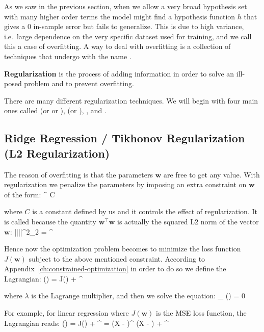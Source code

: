 As we saw in the previous section, when we allow a very broad hypothesis set with many higher order terms the model
might find a hypothesis function $h$ that gives a 0 in-sample error but fails to generalize. This is due to high
variance, i.e.\ large dependence on the very specific dataset used for training, and we call this a case of
overfitting. A way to deal with overfitting is a collection of techniques that undergo with the name
.

\bd[Regularization]
\textbf{Regularization} is the process of adding information in order to solve an ill-posed problem and to prevent
overfitting.
\ed

There are many different regularization techniques. We will begin with four main ones called 
(or  or ),  (or ),
, and .

\subsection{Ridge Regression / Tikhonov Regularization (L2 Regularization)}

The reason of overfitting is that the parameters $\boldsymbol{w}$ are free to get any value. With regularization we
penalize the parameters by imposing an extra constraint on $\boldsymbol{w}$ of the form:
\bse
{}^{\intercal}  \leq C
\ese

where $C$ is a constant defined by us and it controls the effect of regularization. It is called  because the quantity $\boldsymbol{w}^{\intercal} \boldsymbol{w}$ is actually the squared L2 norm of
the vector $\boldsymbol{w}$:
\bse
||||^2_2 = ^{\intercal} 
\ese

Hence now the optimization problem becomes to minimize the loss function $J (\boldsymbol{w})$ subject to the above
mentioned constraint. According to Appendix~\ref{ch:constrained-optimization} in order to do so we define the
Lagrangian:
\bse
{} () = J() +  ^{\intercal} 
\ese

where $\lambda$ is the Lagrange multiplier, and then we solve the equation:
\bse
\nabla_{}  () = 0
\ese

For example, for linear regression where $J(\boldsymbol{w})$ is the MSE loss function, the Lagrangian reads:
{\setlength{\jot}{10pt}
\bse
{} () = J() +  ^{\intercal} 
=  (X  - )^{\intercal} (X  - ) + 
^{\intercal} 
\ese}

